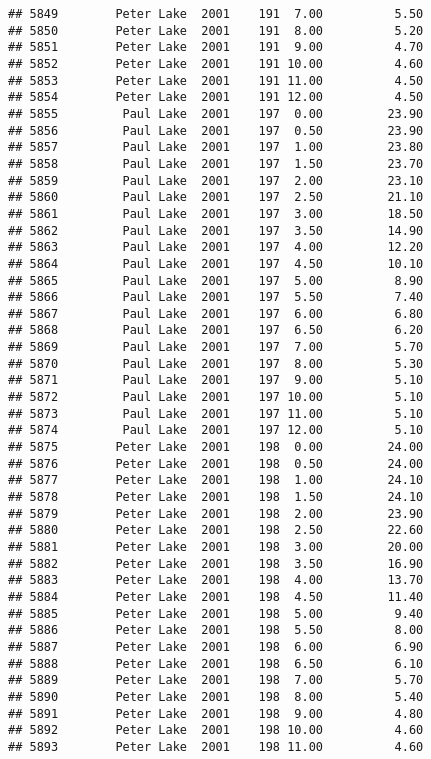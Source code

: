 \documentclass[
]{article}
\begin{document}
\begin{verbatim}
## 5849        Peter Lake  2001    191  7.00          5.50
## 5850        Peter Lake  2001    191  8.00          5.20
## 5851        Peter Lake  2001    191  9.00          4.70
## 5852        Peter Lake  2001    191 10.00          4.60
## 5853        Peter Lake  2001    191 11.00          4.50
## 5854        Peter Lake  2001    191 12.00          4.50
## 5855         Paul Lake  2001    197  0.00         23.90
## 5856         Paul Lake  2001    197  0.50         23.90
## 5857         Paul Lake  2001    197  1.00         23.80
## 5858         Paul Lake  2001    197  1.50         23.70
## 5859         Paul Lake  2001    197  2.00         23.10
## 5860         Paul Lake  2001    197  2.50         21.10
## 5861         Paul Lake  2001    197  3.00         18.50
## 5862         Paul Lake  2001    197  3.50         14.90
## 5863         Paul Lake  2001    197  4.00         12.20
## 5864         Paul Lake  2001    197  4.50         10.10
## 5865         Paul Lake  2001    197  5.00          8.90
## 5866         Paul Lake  2001    197  5.50          7.40
## 5867         Paul Lake  2001    197  6.00          6.80
## 5868         Paul Lake  2001    197  6.50          6.20
## 5869         Paul Lake  2001    197  7.00          5.70
## 5870         Paul Lake  2001    197  8.00          5.30
## 5871         Paul Lake  2001    197  9.00          5.10
## 5872         Paul Lake  2001    197 10.00          5.10
## 5873         Paul Lake  2001    197 11.00          5.10
## 5874         Paul Lake  2001    197 12.00          5.10
## 5875        Peter Lake  2001    198  0.00         24.00
## 5876        Peter Lake  2001    198  0.50         24.00
## 5877        Peter Lake  2001    198  1.00         24.10
## 5878        Peter Lake  2001    198  1.50         24.10
## 5879        Peter Lake  2001    198  2.00         23.90
## 5880        Peter Lake  2001    198  2.50         22.60
## 5881        Peter Lake  2001    198  3.00         20.00
## 5882        Peter Lake  2001    198  3.50         16.90
## 5883        Peter Lake  2001    198  4.00         13.70
## 5884        Peter Lake  2001    198  4.50         11.40
## 5885        Peter Lake  2001    198  5.00          9.40
## 5886        Peter Lake  2001    198  5.50          8.00
## 5887        Peter Lake  2001    198  6.00          6.90
## 5888        Peter Lake  2001    198  6.50          6.10
## 5889        Peter Lake  2001    198  7.00          5.70
## 5890        Peter Lake  2001    198  8.00          5.40
## 5891        Peter Lake  2001    198  9.00          4.80
## 5892        Peter Lake  2001    198 10.00          4.60
## 5893        Peter Lake  2001    198 11.00          4.60

\end{verbatim}
\end{document}
